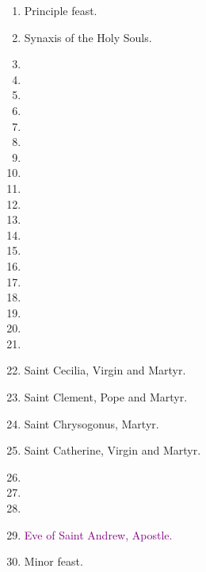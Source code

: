 		\begin{enumerate}
			\item {} Principle feast.
			\item Synaxis of the Holy Souls. 
			\item %
			\item %
			\item %
			\item %
			\item %
			\item %
			\item %
			\item %
			\item %
			\item %
			\item %
			\item %
			\item %
			\item %
			\item %
			\item %
			\item %
			\item %
			\item %
			\item Saint Cecilia, Virgin and Martyr. 
			\item Saint Clement, Pope and Martyr. 
			\item Saint Chrysogonus, Martyr. 
			\item Saint Catherine, Virgin and Martyr. 
			\item %
			\item %
			\item %
			\item \textcolor{purple}{Eve of Saint Andrew, Apostle.}
			\item {} Minor feast.
		\end{enumerate}